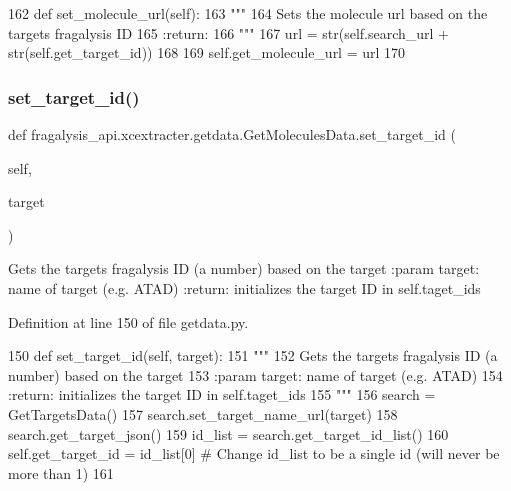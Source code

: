 \begin{DoxyCode}
162     \textcolor{keyword}{def }set\_molecule\_url(self):
163         \textcolor{stringliteral}{"""}
164 \textcolor{stringliteral}{        Sets the molecule url based on the targets fragalysis ID}
165 \textcolor{stringliteral}{        :return:}
166 \textcolor{stringliteral}{        """}
167         url = str(self.search\_url + str(self.get\_target\_id))
168 
169         self.get\_molecule\_url = url
170 
\end{DoxyCode}
\mbox{\label{classfragalysis__api_1_1xcextracter_1_1getdata_1_1_get_molecules_data_acc782fb40405a434903f6d3e80624c9c}} 
\subsubsection{\texorpdfstring{set\+\_\+target\+\_\+id()}{set\_target\_id()}}
{\footnotesize\ttfamily def fragalysis\+\_\+api.\+xcextracter.\+getdata.\+Get\+Molecules\+Data.\+set\+\_\+target\+\_\+id (\begin{DoxyParamCaption}\item[{}]{self,  }\item[{}]{target }\end{DoxyParamCaption})}

\begin{DoxyVerb}Gets the targets fragalysis ID (a number) based on the target
:param target: name of target (e.g. ATAD)
:return: initializes the target ID in self.taget_ids
\end{DoxyVerb}
 

Definition at line 150 of file getdata.\+py.


\begin{DoxyCode}
150     \textcolor{keyword}{def }set\_target\_id(self, target):
151         \textcolor{stringliteral}{"""}
152 \textcolor{stringliteral}{        Gets the targets fragalysis ID (a number) based on the target}
153 \textcolor{stringliteral}{        :param target: name of target (e.g. ATAD)}
154 \textcolor{stringliteral}{        :return: initializes the target ID in self.taget\_ids}
155 \textcolor{stringliteral}{        """}
156         search = GetTargetsData()
157         search.set\_target\_name\_url(target)
158         search.get\_target\_json()
159         id\_list = search.get\_target\_id\_list()
160         self.get\_target\_id = id\_list[0]  \textcolor{comment}{# Change id\_list to be a single id (will never be more than 1)}
161 
\end{DoxyCode}



